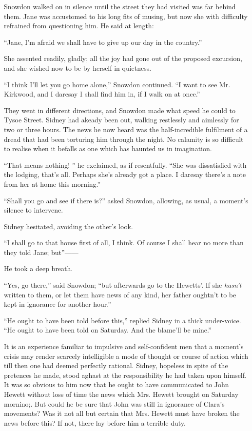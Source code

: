 Snowdon walked on in silence until the street they had visited was far
behind them. Jane was accustomed to his long fits of musing, but now she
with difficulty refrained from questioning him. He said at length:

``Jane, I'm afraid we shall have to give up our day in the country.''

She assented readily, gladly; all the joy had gone out of the proposed
excursion, and she wished now to be by herself in quietness.

``I think I'll let you go home alone,'' Snowdon continued. ``I want to
see Mr. {}Kirkwood, and I daresay I shall find him in, if I walk on at
once.''

They went in different directions, and Snowdon made what speed he could
to Tysoe Street. Sidney had akeady been out, walking restlessly and
aimlessly for two or three hours. The news he now heard was the
half-incredible fulfilment of a dread that had been torturing him
through the night. No calamity is so difficult to realise when it
befalls as one which has haunted us in imagination.

``That means nothing! '' he exclaimed, as if resentfully. ``She was
dissatisfied with the lodging, that's all. Perhaps she's already got a
place. I daresay there's a note from her at home this morning.''

``Shall you go and see if there is?'' asked Snowdon, allowing, as usual,
a moment's silence to intervene.

Sidney hesitated, avoiding the other's look.

``I shall go to that house first of all, I think. Of course I shall hear
no more than they told Jane; but''{{------}}

{}He took a deep breath.

``Yes, go there,'' said Snowdon; ``but afterwards go to the Hewetts'. If
she \emph{hasn't} written to them, or let them have news of any kind,
her father oughtn't to be kept in ignorance for another hour.''

``He ought to have been told before this,'' replied Sidney in a thick
under-voice. ``He ought to have been told on Saturday. And the blame'll
be mine.''

It is an experience familiar to impulsive and self-confident men that a
moment's crisis may render scarcely intelligible a mode of thought or
course of action which till then one had deemed perfectly rational.
Sidney, hopeless in spite of the pretences he made, stood aghast at the
responsibility he had taken upon himself. It was so obvious to him now
that he ought to have communicated to John Hewett without loss of time
the news which Mrs. Hewett brought on Saturday mornino;. But could he be
sure that John was still in ignorance of Clara's movements? Was it not
all but certain that Mrs. Hewett {}must have broken the news before
this? If not, there lay before him a terrible duty.

